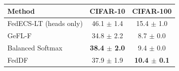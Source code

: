 \begin{tabular}{lcc}
\toprule
Method & CIFAR-10 & CIFAR-100\\
\midrule
FedECS-LT (heads only) & 46.1 $\pm$ 1.4 & 15.4 $\pm$ 1.0\\
GeFL-F & 34.8 $\pm$ 2.2 & 8.7 $\pm$ 0.0\\
Balanced Softmax & \textbf{38.4 $\pm$ 2.0} & 9.4 $\pm$ 0.0\\
FedDF & 37.9 $\pm$ 1.9 & \textbf{10.4 $\pm$ 0.1}\\
\bottomrule
\end{tabular}
